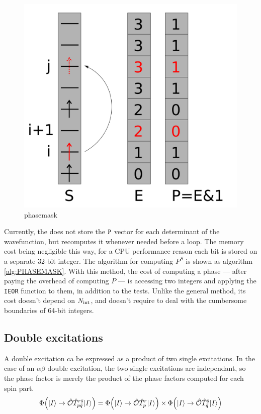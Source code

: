\documentclass[./thesis.tex]{subfiles}
\begin{document}
                
\begin{figure}[h!]
	\begin{center}
		\includegraphics[width=0.6\columnwidth]{figures/determinant_driven/phase}
		\caption{
		\label{generators_selectors}
		phasemask
		}
	\end{center}
\end{figure}
        
Currently, the \QP does not store the ${\texttt{P}}$ vector for each determinant of the wavefunction, but recomputes it whenever needed before a loop. The memory cost being negligible this way, for a CPU performance reason each bit is stored on a separate 32-bit integer.
The algorithm for computing $P^S$ is shown as algorithm \ref{alg:PHASEMASK}. 
With this method, the cost of computing a phase --- after paying the overhead of computing $P$ --- is accessing two integers and applying the \lstinline{IEOR} function to them, in addition to the tests. Unlike the general method, its cost doesn't depend on ${N_\text{int}}$, and doesn't require to deal with the cumbersome boundaries of 64-bit integers.



\subsection{Double excitations}


A double excitation ca be expressed as a product of two single excitations.
In the case of an $\alpha \beta$ double excitation, the two single excitations are independant, so the phase factor is merely the product of the phase factors computed for each spin part. 
\begin{equation}
{\Phi \qty({\ket{I}}\rightarrow {\hat{\mathcal{O}}}{\hat{T}_{p \bar q}^{r \bar s}} {\ket{I}})} = 
{\Phi \qty({\ket{I}} \rightarrow {\hat{\mathcal{O}}} {\hat{T}_{p}^{r}} {\ket{I}})} \times
{\Phi \qty({\ket{I}}\rightarrow {\hat{\mathcal{O}}}{\hat{T}_{\bar q}^{\bar s}} {\ket{I}})} 
\end{equation}
\end{document}
